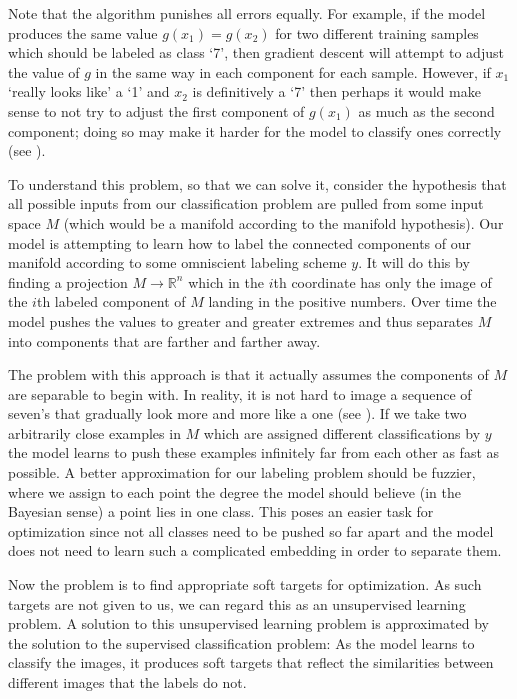 \documentclass[english,a4paper,oneside]{amsart}
\theoremstyle{definition}
\begin{document}
 Note that the algorithm punishes all errors equally. For example, if the model produces the same value $g(x_1)=g(x_2)$ for two different training samples which should be labeled as class `7', then gradient descent will attempt to adjust the value of $g$ in the same way in each component for each sample. However, if $x_1$ `really looks like' a `1' and $x_2$ is definitively a `7' then perhaps it would make sense to not try to adjust the first component of $g(x_1)$ as much as the second component; doing so may make it harder for the model to classify ones correctly (see ). 

To understand this problem, so that we can solve it, consider the hypothesis that all possible inputs from our classification problem are pulled from some input space $M$ (which would be a manifold according to the manifold hypothesis). Our model is attempting to learn how to label the connected components of our manifold according to some omniscient labeling scheme $y$. It will do this by finding a projection $M\to \mathbb{R}^n$ which in the $i$th coordinate has only the image of the  $i$th labeled component of $M$ landing in the positive numbers. Over time the model pushes the values to greater and greater extremes and thus separates $M$ into components that are farther and farther away. 

The problem with this approach is that it actually assumes the components of $M$ are separable to begin with. In reality, it is not hard to image a sequence of seven's that gradually look more and more like a one (see ). If we take two arbitrarily close examples in $M$ which are assigned different classifications by $y$ the model learns to push these examples infinitely far from each other as fast as possible. A better approximation for our labeling problem should be fuzzier, where we assign to each point the degree the model should believe (in the Bayesian sense) a point lies in one class. This poses an easier task for optimization since not all classes need to be pushed so far apart and the model does not need to learn such a complicated embedding in order to separate them. 

Now the problem is to find appropriate soft targets for optimization. As such targets are not given to us, we can regard this as an unsupervised learning problem. A solution to this unsupervised learning problem is approximated by the solution to the supervised classification problem: As the model learns to classify the images, it produces soft targets that reflect the similarities between different images that the labels do not. 
\end{document}
